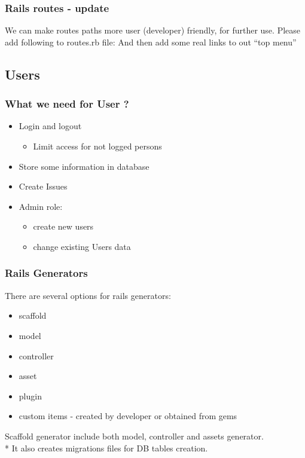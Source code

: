 \documentclass{beamer}
\theoremstyle{mystyle}
\begin{document}
    \begin{frame}
      \frametitle{Rails routes - update}
      We can make routes paths more user (developer) friendly, for further use.
      Please add following to routes.rb file:
      \routeupdateI
      And then add some real links to out ``top menu''
      \railsreallinksI
    \end{frame}

  \subsection{Users}
    \begin{frame}
      \frametitle{What we need for User ?}
      \begin{itemize}
      \item Login and logout
        \begin{itemize}
        \item Limit access for not logged persons
        \end{itemize}
      \item Store some information in database
      \item Create Issues
      \item Admin role:
        \begin{itemize}
        \item create new users
        \item change existing Users data
        \end{itemize}
      \end{itemize}
    \end{frame}
    
    \begin{frame}
      \frametitle{Rails Generators}
        There are several options for rails generators:
        \begin{itemize}
        \item scaffold
        \item model
        \item controller
        \item asset
        \item plugin
        \item custom items - created by developer or obtained from gems
        \end{itemize}
        \begin{definition}
          Scaffold generator include both model, controller and assets
          generator.\\*
          It also creates migrations files for DB tables creation.
        \end{definition}
        \generatorscaffold
    \end{frame}
\end{document}
